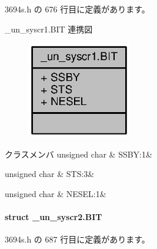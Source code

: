  3694s.\+h の 676 行目に定義があります。



\+\_\+un\+\_\+syscr1.\+B\+I\+T 連携図
\nopagebreak
\begin{figure}[H]
\begin{center}
\leavevmode
\includegraphics[width=130pt]{d0/d74/struct__un__syscr1_8BIT__coll__graph}
\end{center}
\end{figure}
\begin{DoxyFields}{クラスメンバ}
unsigned char\label{3694s_8h_a041cadd682f18f2948fa4c65d82fe9f4}
&
S\+S\+B\+Y\+:1&
\\
\hline

unsigned char\label{3694s_8h_acb0b2563e78014816403ebdf7c63d4d3}
&
S\+T\+S\+:3&
\\
\hline

unsigned char\label{3694s_8h_a41610f6ae14203a17c15cf2144fbe982}
&
N\+E\+S\+E\+L\+:1&
\\
\hline

\end{DoxyFields}
\label{struct__un__syscr2_8BIT}
\paragraph{struct \+\_\+un\+\_\+syscr2.\+B\+I\+T}


 3694s.\+h の 687 行目に定義があります。



